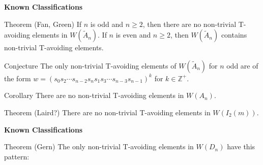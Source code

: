 \documentclass{beamer}
\newcommand\heapblock[4]{\fill[fill=#4, fill opacity=0.35, draw=#4, line width=1.1pt, rounded corners,shift={(\xxaxis:#1)},shift={(\yyaxis:#2)}] (-1,-1) rectangle (1,1);\node at (#1,#2) {\footnotesize $#3$};}
\newcommand\xxaxis{0}
\newcommand\yyaxis{90}
\begin{document}


\begin{frame}{\textbf{Known Classifications}}

\begin{block}{Theorem (Fan, Green)}
	If $n$ is odd and $n \geq 2$, then there are no non-trivial T-avoiding elements in $W(\widetilde{A}_n)$. If $n$ is even and $n \geq 2$, then $W(\widetilde{A}_n)$ contains non-trivial T-avoiding elements.
\end{block}
\pause
\begin{block}{Conjecture}
The only non-trivial T-avoiding elements of $W(\widetilde{A}_n)$ for $n$ odd are of the form $w=(s_0s_2 \cdots s_{n-2}s_ns_1s_3 \cdots s_{n-3}s_{n-1})^k$  for $k \in \mathbb{Z}^+$.	
\end{block}
\pause
\begin{block}{Corollary}
There are no non-trivial T-avoiding elements in $W(A_n)$.	
\end{block}
\pause
\begin{block}{Theorem (Laird?)}
	There are no non-trivial T-avoiding elements in $W(I_2(m))$.
\end{block}

\end{frame}




\begin{frame}{\textbf{Known Classifications}}

\begin{block}{Theorem (Gern)}
The only non-trivial T-avoiding elements in $W(D_n)$ have this pattern:	
\end{block}

\begin{figure}
\end{figure}
	
\end{frame}
\end{document}
